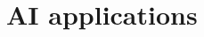 \documentclass[10pt,compress]{beamer} %
\begin{document}
\section{AI applications}



\end{document}
